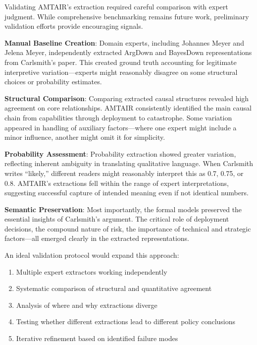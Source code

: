 \documentclass[
  11pt,
  letterpaper,
]{book}
\providecommand{\tightlist}{%
  \setlength{\itemsep}{0pt}\setlength{\parskip}{0pt}}
\begin{document}
Validating AMTAIR's extraction required careful comparison with expert
judgment. While comprehensive benchmarking remains future work,
preliminary validation efforts provide encouraging signals.

\textbf{Manual Baseline Creation}: Domain experts, including Johannes
Meyer and Jelena Meyer, independently extracted ArgDown and BayesDown
representations from Carlsmith's paper. This created ground truth
accounting for legitimate interpretive variation---experts might
reasonably disagree on some structural choices or probability estimates.

\textbf{Structural Comparison}: Comparing extracted causal structures
revealed high agreement on core relationships. AMTAIR consistently
identified the main causal chain from capabilities through deployment to
catastrophe. Some variation appeared in handling of auxiliary
factors---where one expert might include a minor influence, another
might omit it for simplicity.

\textbf{Probability Assessment}: Probability extraction showed greater
variation, reflecting inherent ambiguity in translating qualitative
language. When Carlsmith writes ``likely,'' different readers might
reasonably interpret this as 0.7, 0.75, or 0.8. AMTAIR's extractions
fell within the range of expert interpretations, suggesting successful
capture of intended meaning even if not identical numbers.

\textbf{Semantic Preservation}: Most importantly, the formal models
preserved the essential insights of Carlsmith's argument. The critical
role of deployment decisions, the compound nature of risk, the
importance of technical and strategic factors---all emerged clearly in
the extracted representations.

An ideal validation protocol would expand this approach:

\begin{enumerate}
\def\labelenumi{\arabic{enumi}.}
\tightlist
\item
  Multiple expert extractors working independently
\item
  Systematic comparison of structural and quantitative agreement
\item
  Analysis of where and why extractions diverge
\item
  Testing whether different extractions lead to different policy
  conclusions
\item
  Iterative refinement based on identified failure modes
\end{enumerate}
\end{document}
